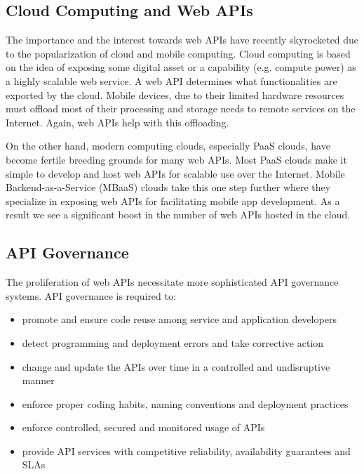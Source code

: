 \subsection{Cloud Computing and Web APIs}
The importance and the interest towards web APIs have recently skyrocketed due to the popularization of cloud and mobile computing.
Cloud computing is based on the idea of exposing some digital asset or a capability (e.g. compute power) as a highly scalable web service. A 
web API determines
what functionalities are exported by the cloud. Mobile devices, due to their limited hardware
resources must offload most of their processing and storage needs to remote services on the Internet. Again, web APIs help with this offloading. 

On the other hand, modern computing clouds, especially PaaS clouds, have become fertile breeding grounds for many web APIs. 
Most PaaS clouds make it simple to develop and host web APIs for scalable use over the Internet. Mobile 
Backend-as-a-Service (MBaaS) clouds take this one step further where they specialize in exposing web APIs for facilitating mobile
app development. As a result we see a significant boost in the number of web APIs hosted in the cloud.

\subsection{API Governance}
The proliferation of web APIs necessitate more sophisticated API governance systems. API governance is required to:
\begin{itemize}
\item promote and ensure code reuse among service and application developers
\item detect programming and deployment errors and take corrective action
\item change and update the APIs over time in a controlled and undisruptive manner
\item enforce proper coding habits, naming conventions and deployment practices
\item enforce controlled, secured and monitored usage of APIs
\item provide API services with competitive reliability, availability guarantees and SLAs
\end{itemize}

